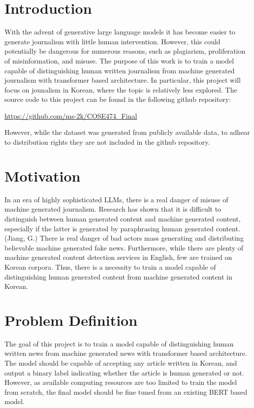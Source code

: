 \documentclass{article}
\begin{document}
\section{Introduction}
\quad With the advent of generative large language models it has become easier to generate journalism with little human intervention.
However, this could potentially be dangerous for numerous reasons, such as plagiarism, proliferation of misinformation, and misuse.
The purpose of this work is to train a model capable of distinguishing human written journalism from machine generated journalism with transformer based architecture.
In particular, this project will focus on jounalism in Korean, where the topic is relatively less explored. \linebreak
\null\quad The source code to this project can be found in the following github repository:
\begin{center}
    \url{https://github.com/ms-2k/COSE474_Final}
\end{center}
\null\quad However, while the dataset was generated from publicly available data, to adhear to distribution rights they are not included in the github repository.

\section{Motivation}
\null\quad In an era of highly sophisticated LLMs, there is a real danger of misuse of machine generated journalism.
Research has shown that it is difficult to distinguish between human generated content and machine generated content, especially if the latter is generated by paraphrasing human generated content. (Jiang, G.)
There is real danger of bad actors mass generating and distributing believable machine generated fake news. \linebreak
\null\quad Furthermore, while there are plenty of machine generated content detection services in English, few are trained on Korean corpora.
Thus, there is a necessity to train a model capable of distinguishing human generated content from machine generated content in Korean.

\section{Problem Definition}
\null\quad The goal of this project is to train a model capable of distinguishing human written news from machine generated news with transformer based architecture.
The model should be capable of accepting any article written in Korean, and output a binary label indicating whether the article is human generated or not.
However, as available computing resources are too limited to train the model from scratch, the final model should be fine tuned from an existing BERT based model.
\end{document}
